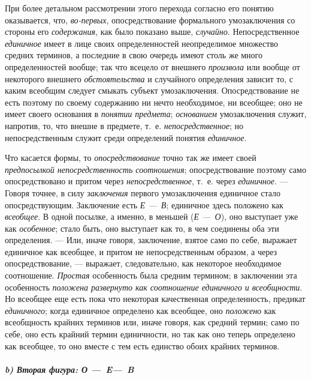 \documentclass[twoside]{article}
\begin{document}
{{{При более детальном рассмотрении этого перехода согласно его
понятию оказывается, что,
{\em во-первых},
опосредствование формального умозаключения со стороны его
{\em содержания}, как
было показано выше, {\em случайно}.
Непосредственное
{\em единичное} имеет в
лице своих определенностей неопределимое множество средних терминов, а
последние в свою очередь имеют столь же много определенностей вообще; так
что всецело от внешнего {\em произвола}
или вообще от некоторого внешнего
{\em обстоятельства} и
случайного определения зависит то, с каким всеобщим следует смыкать субъект
умозаключения. Опосредствование не есть поэтому по своему содержанию ни
нечто необходимое, ни всеобщее; оно не имеет своего основания в
{\em понятии предмета};
{\em основанием}
умозаключения служит, напротив, то, что внешне в предмете,
т.~е. {\em непосредственное};
но непосредственным служит среди определений понятия
{\em единичное}.

Что касается формы, то
{\em опосредствование}
точно так же имеет своей
{\em предпосылкой непосредственность
соотношения}; опосредствование поэтому само опосредствовано
и притом через {\em непосредственное},
т.~е. через
{\em единичное}. — Говоря
точнее, в силу {\em заключения}
первого умозаключения единичное стало опосредствующим.
Заключение есть {\em Е
—~В}; единичное здесь положено как
{\em всеобщее}. В одной
посылке, а именно, в меньшей ({\em Е
—~О}), оно выступает уже как
{\em особенное}; стало
быть, оно выступает как то, в чем соединены оба эти определения. —
Или, иначе говоря, заключение, взятое само по себе, выражает
единичное как всеобщее, и притом не непосредственным образом, а через
опосредствование, — выражает, следовательно, как некоторое
необходимое соотношение. {\em Простая}
особенность была средним термином; в заключении эта
особенность {\em положена развернуто как
соотношение единичного и всеобщности}. Но всеобщее еще есть
пока что некоторая качественная определенность, предикат
{\em единичного}; когда
единичное определено как всеобщее, оно
{\em положено} как
всеобщность крайних терминов или, иначе говоря, как средний термин; само по
себе, оно есть крайний термин единичности, но так как оно теперь определено
как всеобщее, то оно вместе с тем есть единство обоих крайних терминов.

\subparagraph[b)Вторая фигура: О~—~E~—~B]{b) Вторая фигура: {\em О —~E—~B}}}}}
\end{document}
